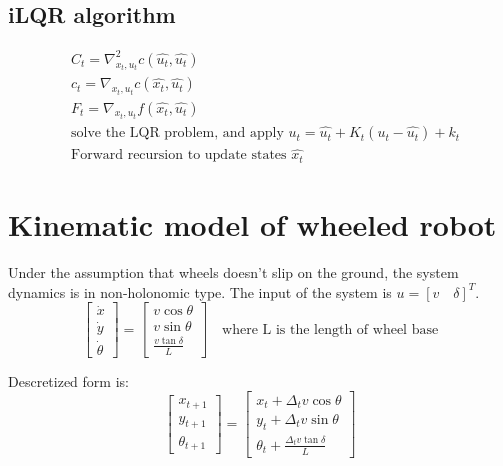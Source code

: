 \documentclass{article}
\begin{document}
\subsection{iLQR algorithm}
\begin{align*}
    & C_t = \nabla_{x_t, u_t}^2 c(\hat{u_t}, \hat{u_t})\\
    & c_t = \nabla_{x_t, u_t} c(\hat{x_t}, \hat{u_t})\\
    & F_t = \nabla_{x_t, u_t} f(\hat{x_t}, \hat{u_t})\\
    & \text{solve the LQR problem, and apply } u_t = \hat{u_t} + K_t(u_t - \hat{u_t}) + k_t\\
    & \text{Forward recursion to update states } \hat{x_t}
\end{align*}

\section{Kinematic model of wheeled robot}
Under the assumption that wheels doesn't slip on the ground, the system dynamics is in non-holonomic type. The input of the system is $u=[v \quad \delta]^T$.
\begin{equation}
    \begin{bmatrix}
        \dot x\\ \dot y\\ \dot \theta
    \end{bmatrix} = \begin{bmatrix}
        v\cos{\theta}\\
        v\sin{\theta}\\
        \frac{v\tan{\delta}}{L}
    \end{bmatrix} \quad \text{where L is the length of wheel base}
\end{equation}

Descretized form is:
\begin{equation}
    \begin{bmatrix}
        x_{t + 1}\\ y_{t + 1}\\ \theta_{t + 1}
    \end{bmatrix} = \begin{bmatrix}
        x_t + \Delta_t v\cos{\theta}\\
        y_t + \Delta_t v\sin{\theta}\\
        \theta_t + \frac{\Delta_t v\tan{\delta}}{L}
    \end{bmatrix} \label{descret-kinematic-dynamics}
\end{equation}
\end{document}
